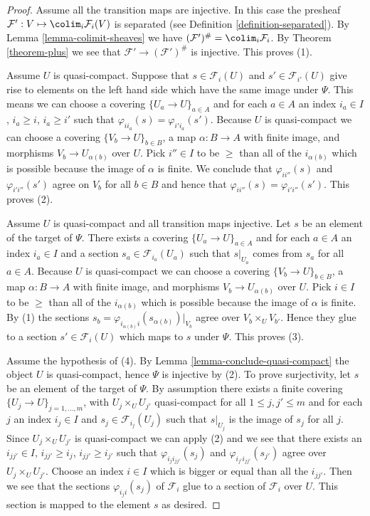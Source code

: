 \begin{proof}
Assume all the transition maps are injective. In this case the presheaf
$\mathcal{F}' : V \mapsto \colim_i \mathcal{F}_i(V)$ is
separated (see Definition \ref{definition-separated}).
By Lemma \ref{lemma-colimit-sheaves}
we have
$(\mathcal{F}')^\# = \colim_i \mathcal{F}_i$.
By Theorem \ref{theorem-plus}
we see that $\mathcal{F}' \to (\mathcal{F}')^\#$ is injective.
This proves (1).

\medskip\noindent
Assume $U$ is quasi-compact. Suppose that $s \in \mathcal{F}_i(U)$ and
$s' \in \mathcal{F}_{i'}(U)$ give rise to elements on
the left hand side which have the same image under $\Psi$.
This means we can choose a covering $\{U_a \to U\}_{a \in A}$
and for each $a \in A$ an index $i_a \in I$, $i_a \geq i$, $i_a \geq i'$
such that $\varphi_{ii_a}(s) = \varphi_{i'i_a}(s')$.
Because $U$ is quasi-compact we can choose a covering
$\{V_b \to U\}_{b \in B}$, a map $\alpha : B \to A$ with finite image,
and morphisms $V_b \to U_{\alpha(b)}$ over $U$.
Pick $i''\in I$ to be $\geq$ than all of the $i_{\alpha(b)}$
which is possible because the image of $\alpha$ is finite.
We conclude that $\varphi_{ii''}(s)$ and $\varphi_{i'i''}(s')$
agree on $V_b$ for all $b \in B$ and hence that
$\varphi_{ii''}(s) = \varphi_{i'i''}(s')$. This proves (2).

\medskip\noindent
Assume $U$ is quasi-compact and all transition maps injective.
Let $s$ be an element of the target of $\Psi$. There exists a covering
$\{U_a \to U\}_{a \in A}$ and for each $a \in A$ an index $i_a \in I$
and a section $s_a \in \mathcal{F}_{i_a}(U_a)$
such that $s|_{U_a}$ comes from $s_a$ for all $a \in A$.
Because $U$ is quasi-compact we can choose a covering
$\{V_b \to U\}_{b \in B}$, a map $\alpha : B \to A$ with finite image,
and morphisms $V_b \to U_{\alpha(b)}$ over $U$.
Pick $i \in I$ to be $\geq$ than all of the $i_{\alpha(b)}$
which is possible because the image of $\alpha$ is finite.
By (1) the sections
$s_b = \varphi_{i_{\alpha(b)} i}(s_{\alpha(b)})|_{V_b}$
agree over $V_b \times_U V_{b'}$.
Hence they glue to a section
$s' \in \mathcal{F}_i(U)$ which maps to $s$ under $\Psi$.
This proves (3).

\medskip\noindent
Assume the hypothesis of (4). By Lemma \ref{lemma-conclude-quasi-compact}
the object $U$ is quasi-compact, hence $\Psi$ is injective by (2).
To prove surjectivity, let $s$ be an element of the target of $\Psi$.
By assumption there  exists a finite covering
$\{U_j \to U\}_{j = 1, \ldots, m}$, with $U_j \times_U U_{j'}$
quasi-compact for all $1 \leq j, j' \leq m$ and
for each $j$ an index $i_j \in I$ and $s_j \in \mathcal{F}_{i_j}(U_j)$
such that $s|_{U_j}$ is the image of $s_j$ for all $j$.
Since $U_j \times_U U_{j'}$ is quasi-compact we can apply (2)
and we see that there exists an $i_{jj'} \in I$,
$i_{jj'} \geq i_j$, $i_{jj'} \geq i_{j'}$ such that
$\varphi_{i_ji_{jj'}}(s_j)$ and $\varphi_{i_{j'}i_{jj'}}(s_{j'})$
agree over $U_j \times_U U_{j'}$. Choose an index $i \in I$
which is bigger or equal than all the $i_{jj'}$. Then we see that
the sections $\varphi_{i_ji}(s_j)$ of $\mathcal{F}_i$ glue
to a section of $\mathcal{F}_i$ over $U$. This section is mapped
to the element $s$ as desired.
\end{proof}

